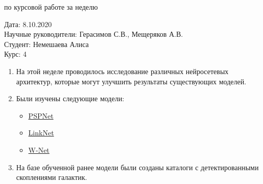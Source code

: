\documentclass{article}
\begin{document}
\begin{center}{ по курсовой работе за неделю\\}\end{center}
Дата: 8.10.2020\\
Научные руководители: Герасимов С.В., Мещеряков А.В.\\
Студент: Немешаева Алиса\\
Курс: 4\\

\renewcommand{\labelitemi}{$\blacksquare$}
\renewcommand\labelitemii{$\square$}
\begin{enumerate}
    \item На этой неделе проводилось исследование различных нейросетевых архитектур, которые могут
        улучшить результаты существующих моделей.\\
    \item Были изучены следующие модели:\\
        \begin{itemize}
            \item \hyperlink{https://arxiv.org/pdf/1612.01105.pdf}{PSPNet}\\ 
            \item \hyperlink{https://arxiv.org/pdf/1707.03718.pdf}{LinkNet}\\
            \item \hyperlink{https://arxiv.org/pdf/2009.01907.pdf}{W-Net}\\
        \end{itemize}
    \item На базе обученной ранее модели были созданы каталоги с детектированными скоплениями 
        галактик.\\

\end{enumerate}
\end{document}

